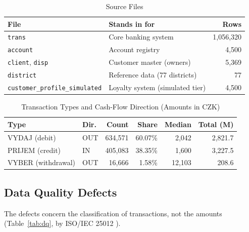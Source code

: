 \documentclass[peerreview]{IEEEtran}
\newcommand{\tbl}[1]{\texttt{#1}}
\begin{document}
\begin{table}[!t]
\centering
\caption{Source Files}
\label{tab:sources}
\footnotesize
\setlength{\tabcolsep}{4pt}
\begin{tabular}{L{2.5cm} L{3.2cm} r}
\toprule
\textbf{File} & \textbf{Stands in for} & \textbf{Rows} \\
\midrule
\tbl{trans} & Core banking system & 1,056,320 \\
\tbl{account} & Account registry & 4,500 \\
\tbl{client}, \tbl{disp} & Customer master (owners) & 5,369 \\
\tbl{district} & Reference data (77 districts) & 77 \\
\tbl{customer\_profile\_\allowbreak simulated} & Loyalty system (simulated tier) & 4,500 \\
\bottomrule
\end{tabular}
\end{table}

\begin{table}[!t]
\centering
\caption{Transaction Types and Cash-Flow Direction (Amounts in CZK)}
\label{tab:types}
\footnotesize
\setlength{\tabcolsep}{2.5pt}
\begin{tabular}{l l r r r r}
\toprule
\textbf{Type} & \textbf{Dir.} & \textbf{Count} & \textbf{Share} & \textbf{Median} & \textbf{Total (M)} \\
\midrule
VYDAJ (debit) & OUT & 634,571 & 60.07\% & 2,042 & 2,821.7 \\
PRIJEM (credit) & IN & 405,083 & 38.35\% & 1,600 & 3,227.5 \\
VYBER (withdrawal) & OUT & 16,666 & 1.58\% & 12,103 & 208.6 \\
\bottomrule
\end{tabular}
\end{table}

\subsection{Data Quality Defects}
\label{sec:data-quality}
The defects concern the classification of transactions, not the amounts
(Table~\ref{tab:dq}, by ISO/IEC 25012 \cite{iso25012}).
\end{document}
